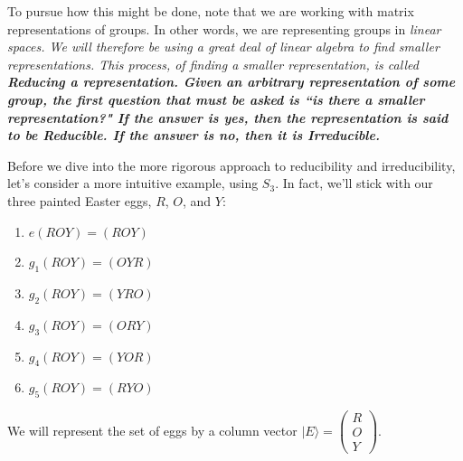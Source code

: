 \documentclass[12pt,epsf]{article}
\begin{document}
To pursue how this might be done, note that we are working with matrix
representations of groups.  In other words, we are representing groups
in \it linear spaces\rm.  We will therefore be using a great deal of
linear algebra to find smaller representations.  This process, of
finding a smaller representation, is called \bf Reducing \rm a
representation.  Given an arbitrary representation of some group, the
first question that must be asked is ``is there a smaller
representation?"  If the answer is yes, then the representation is said
to be \bf Reducible\rm.  If the answer is no, then it is \bf
Irreducible\rm.  

Before we dive into the more rigorous approach to reducibility and
irreducibility, let's consider a more intuitive example, using $S_3$. 
In fact, we'll stick with our three painted Easter eggs, $R$, $O$, and
$Y$:  
\begin{enumerate}
\parskip -4pt
\item $e(ROY) = (ROY)$
\item $g_1(ROY) = (OYR)$
\item $g_2(ROY) = (YRO) $
\item $g_3(ROY) = (ORY) $
\item $g_4(ROY) = (YOR) $
\item $g_5(ROY) = (RYO) $
\end{enumerate}
We will represent the set of eggs by a column vector $|E\rangle = 
\begin{pmatrix}
R \\ O \\ Y
\end{pmatrix}$.  
\end{document}
